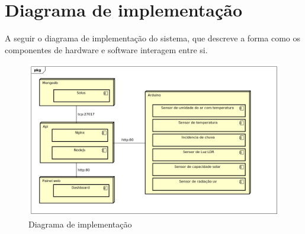 \chapter{Diagrama de implementação}

A seguir o diagrama de implementação do sistema, que descreve a forma como os componentes de hardware e software interagem entre si.

\begin{figure}[H]
    \label{figure_diagrama_implementacao}
    \centering
    \caption{Diagrama de implementação}
    \includegraphics[scale=0.6]{diagrams/implementacao.png}
    \hfill
\end{figure}